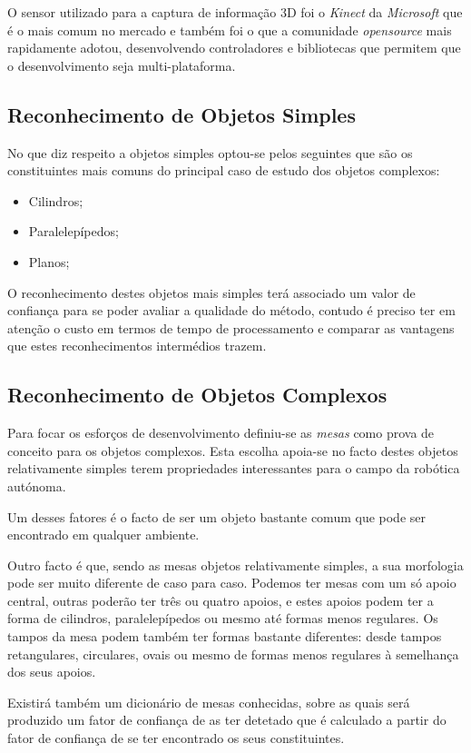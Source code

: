 O sensor utilizado para a captura de informação 3D foi o \emph{Kinect} da \emph{Microsoft} que é o mais comum no mercado e também foi o que a comunidade \emph{opensource} mais rapidamente adotou, desenvolvendo controladores e bibliotecas que permitem que o desenvolvimento seja multi-plataforma.


\subsection{Reconhecimento de Objetos Simples}

No que diz respeito a objetos simples optou-se pelos seguintes que são os constituintes mais comuns
do principal caso de estudo dos objetos complexos:
\begin{itemize}
\item Cilindros;
\item Paralelepípedos;
\item Planos;
\end{itemize}

O reconhecimento destes objetos mais simples terá associado um valor de confiança para se poder avaliar a qualidade do método, contudo é preciso ter em atenção o custo em termos de tempo de processamento e comparar as vantagens que estes reconhecimentos intermédios trazem.
 
\subsection{Reconhecimento de Objetos Complexos}

Para focar os esforços de desenvolvimento definiu-se as \emph{mesas} como prova de conceito para os objetos complexos. Esta escolha apoia-se no facto destes objetos relativamente simples terem propriedades interessantes para o campo da robótica autónoma.

Um desses fatores é o facto de ser um objeto bastante comum que pode ser encontrado em qualquer ambiente.

Outro facto é que, sendo as mesas objetos relativamente simples, a sua morfologia pode ser muito diferente de caso para caso. Podemos ter mesas com um só apoio central, outras poderão ter três ou quatro apoios, e estes apoios podem ter a forma de cilindros, paralelepípedos ou mesmo até formas menos regulares. Os tampos da mesa podem também ter formas bastante diferentes: desde tampos retangulares, circulares, ovais ou mesmo de formas menos regulares à semelhança dos seus apoios.

Existirá também um dicionário de mesas conhecidas, sobre as quais será produzido um fator de confiança de as ter detetado que é calculado a partir do fator de confiança de se ter encontrado os seus constituintes.

